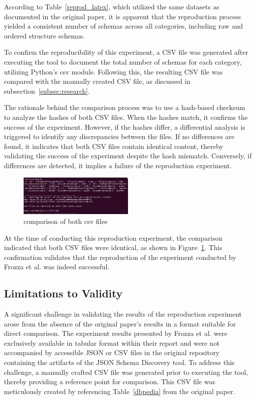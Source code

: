 \documentclass[sigconf, nonacm]{acmart}
\begin{document}
According to Table~\ref{reprod_latex}, which utilized the same datasets as documented in the original paper, it is apparent that the reproduction process yielded a consistent number of schemas across all categories, including raw and ordered structure schemas.

To confirm the reproducibility of this experiment, a CSV file was generated after executing the tool to document the total number of schemas for each category, utilizing Python's csv module. Following this, the resulting CSV file was compared with the manually created CSV file, as discussed in subsection~\ref{subsec:research}.

The rationale behind the comparison process was to use a hash-based checksum to analyze the hashes of both CSV files. When the hashes match, it confirms the success of the experiment. However, if the hashes differ, a differential analysis is triggered to identify any discrepancies between the files. If no differences are found, it indicates that both CSV files contain identical content,  thereby validating the success of the experiment despite the hash mismatch. Conversely, if differences are detected, it implies a failure of the reproduction experiment.

 \begin{figure}
     \centering
     \includegraphics[height=0.2\textwidth, width=0.5\textwidth]{img/experiment.png}
     \caption{comparison of both csv files }
     \label{fig:experiment}
 \end{figure}

At the time of conducting this reproduction experiment, the comparison indicated that both CSV files were identical, as shown in Figure~\ref{fig:experiment}. This confirmation validates that the reproduction of the experiment conducted by Frozza et al. \cite{frozza2018approach} was indeed successful.

\subsection{Limitations to Validity}
A significant challenge in validating the results of the reproduction experiment arose from the absence of the original paper's results in a format suitable for direct comparison. The experiment results presented by Frozza et al. \cite{frozza2018approach} were exclusively available in tabular format within their report and were not accompanied by accessible JSON or CSV files in the original repository containing the artifacts of the JSON Schema Discovery tool. To address this challenge, a manually crafted CSV file was generated prior to executing the tool, thereby providing a reference point for comparison. This CSV file was meticulously created by referencing Table~\ref{dbpedia} from the original paper.
\end{document}
